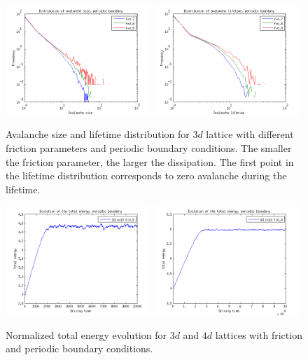 \begin{figure} 
\begin{center}
\includegraphics[width=0.49\textwidth]{results/3spfmulti.png}
\includegraphics[width=0.49\textwidth]{results/3tpfmulti.png} 
\caption{Avalanche size and lifetime distribution for $3d$ lattice with different friction parameters and periodic boundary conditions. 
The smaller the friction parameter, the larger the dissipation. 
The first point in the lifetime distribution corresponds to zero avalanche during the lifetime.}
\label{3spf}
\end{center}
\end{figure}  

\begin{figure} 
\begin{center}
\includegraphics[width=0.49\textwidth]{results/3ep.png}
\includegraphics[width=0.49\textwidth]{results/4ep.png} 
\caption{Normalized total energy evolution for $3d$ and $4d$ lattices with friction and periodic boundary conditions. }
\label{ep}
\end{center}
\end{figure}  




